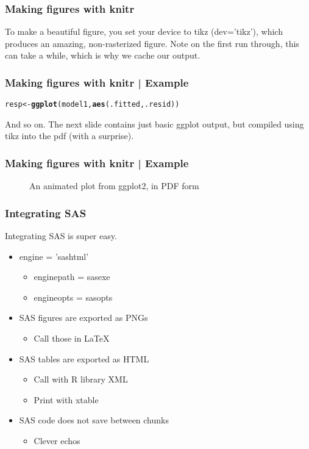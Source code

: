 \documentclass{beamer}\usepackage[]{graphicx}\usepackage[]{color}
\makeatletter
\newcommand{\hlstd}[1]{\textcolor[rgb]{0.345,0.345,0.345}{#1}}%
\newcommand{\hlkwb}[1]{\textcolor[rgb]{0.69,0.353,0.396}{#1}}%
\newcommand{\hlkwd}[1]{\textcolor[rgb]{0.737,0.353,0.396}{\textbf{#1}}}%
\newenvironment{kframe}{%
 \def\at@end@of@kframe{}%
 \ifinner\ifhmode%
  \def\at@end@of@kframe{\end{minipage}}%
  \begin{minipage}{\columnwidth}%
 \fi\fi%
 \def\FrameCommand##1{\hskip\@totalleftmargin \hskip-\fboxsep
 \colorbox{shadecolor}{##1}\hskip-\fboxsep
     \hskip-\linewidth \hskip-\@totalleftmargin \hskip\columnwidth}%
 \MakeFramed {\advance\hsize-\width
   \@totalleftmargin\z@ \linewidth\hsize
   \@setminipage}}%
 {\par\unskip\endMakeFramed%
 \at@end@of@kframe}
\newenvironment{knitrout}{}{} %
\makeatother
\begin{document}
		\begin{frame}
\frametitle{Making figures with knitr}
To make a beautiful figure, you set your device to tikz (dev='tikz'), which produces an amazing, non-rasterized figure. Note on the first run through, this can take a while, which is why we cache our output.
\end{frame}
		\begin{frame}
\frametitle{Making figures with knitr | Example}
\begin{knitrout}
\color{fgcolor}\begin{kframe}
\begin{alltt}
\hlstd{resp}\hlkwb{<-}\hlkwd{ggplot}\hlstd{(model1,} \hlkwd{aes}\hlstd{(.fitted,.resid))}
\end{alltt}
\end{kframe}
\end{knitrout}
And so on. The next slide contains just basic ggplot output, but compiled using tikz into the pdf (with a surprise). 
\end{frame}
\begin{frame}
\frametitle{Making figures with knitr | Example}
\begin{figure}[H]
	\caption{An animated plot from ggplot2, in PDF form}
\begin{knitrout}
\color{fgcolor}





\end{knitrout}
\end{figure}
\end{frame}
		\begin{frame}
			\frametitle{Integrating SAS}
			Integrating SAS is super easy. 
			\begin{itemize}[<+->]
				\item engine = 'sashtml'
				\begin{itemize}
					\item enginepath = sasexe
					\item engineopts = sasopts
				\end{itemize}
			\item SAS figures are exported as PNGs
			\begin{itemize}
				\item Call those in \LaTeX
			\end{itemize}
		\item SAS tables are exported as HTML
		\begin{itemize}
			\item Call with R library XML
			\item Print with xtable
		\end{itemize}
	\item SAS code does not save between chunks
	\begin{itemize}
		\item Clever echos
	\end{itemize}
		\end{itemize}
		\end{frame}
\end{document}
